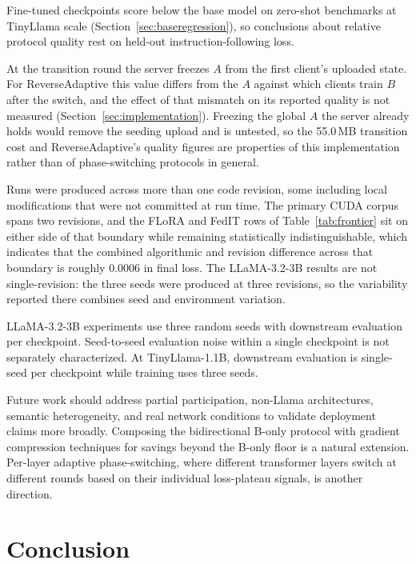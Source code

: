 \documentclass[iicol,pdflatex,sn-mathphys-num]{sn-jnl}
\begin{document}
Fine-tuned checkpoints score below the base model on zero-shot benchmarks at TinyLlama scale (Section~\ref{sec:baseregression}), so conclusions about relative protocol quality rest on held-out instruction-following loss.

At the transition round the server freezes $A$ from the first client's uploaded state. For ReverseAdaptive this value differs from the $A$ against which clients train $B$ after the switch, and the effect of that mismatch on its reported quality is not measured (Section~\ref{sec:implementation}). Freezing the global $A$ the server already holds would remove the seeding upload and is untested, so the 55.0\,MB transition cost and ReverseAdaptive's quality figures are properties of this implementation rather than of phase-switching protocols in general.

Runs were produced across more than one code revision, some including local modifications that were not committed at run time. The primary CUDA corpus spans two revisions, and the FLoRA and FedIT rows of Table~\ref{tab:frontier} sit on either side of that boundary while remaining statistically indistinguishable, which indicates that the combined algorithmic and revision difference across that boundary is roughly 0.0006 in final loss. The LLaMA-3.2-3B results are not single-revision: the three seeds were produced at three revisions, so the variability reported there combines seed and environment variation.

LLaMA-3.2-3B experiments use three random seeds with downstream evaluation per checkpoint. Seed-to-seed evaluation noise within a single checkpoint is not separately characterized. At TinyLlama-1.1B, downstream evaluation is single-seed per checkpoint while training uses three seeds.

Future work should address partial participation, non-Llama architectures, semantic heterogeneity, and real network conditions to validate deployment claims more broadly. Composing the bidirectional B-only protocol with gradient compression techniques \cite{alistarh2017qsgd,lin2017deep} for savings beyond the B-only floor is a natural extension. Per-layer adaptive phase-switching, where different transformer layers switch at different rounds based on their individual loss-plateau signals, is another direction.

\section{Conclusion}
\label{sec:conclusion}
\end{document}
